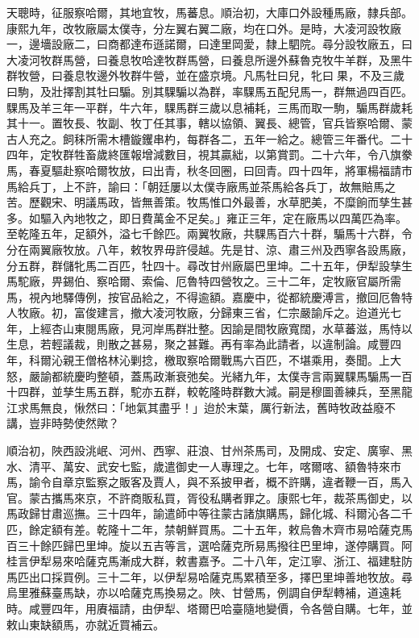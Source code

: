 \begin{pinyinscope}
天聰時，征服察哈爾，其地宜牧，馬蕃息。順治初，大庫口外設種馬廠，隸兵部。康熙九年，改牧廠屬太僕寺，分左翼右翼二廠，均在口外。是時，大凌河設牧廠一，邊墻設廠二，曰商都達布遜諾爾，曰達里岡愛，隸上駟院。尋分設牧廠五，曰大凌河牧群馬營，曰養息牧哈達牧群馬營，曰養息所邊外蘇魯克牧牛羊群，及黑牛群牧營，曰養息牧邊外牧群牛營，並在盛京境。凡馬牡曰兒，牝曰果，不及三歲曰駒，及壯擇割其牡曰騸。別其騍騸以為群，率騍馬五配兒馬一，群無過四百匹。騍馬及羊三年一平群，牛六年，騍馬群三歲以息補耗，三馬而取一駒，騸馬群歲耗其十一。置牧長、牧副、牧丁任其事，轄以協領、翼長、總管，官兵皆察哈爾、蒙古人充之。飼秣所需木槽鏇钁串杓，每群各二，五年一給之。總管三年番代。二十四年，定牧群牲畜歲終匯報增減數目，視其贏絀，以第賞罰。二十六年，令八旗豢馬，春夏驅赴察哈爾牧放，曰出青，秋冬回圈，曰回青。四十四年，將軍楊福請市馬給兵丁，上不許，諭曰：「朝廷屢以太僕寺廠馬並茶馬給各兵丁，故無賠馬之苦。歷觀宋、明議馬政，皆無善策。牧馬惟口外最善，水草肥美，不糜餉而孳生甚多。如驅入內地牧之，即日費萬金不足矣。」雍正三年，定在廠馬以四萬匹為率。至乾隆五年，足額外，溢七千餘匹。兩翼牧廠，共騍馬百六十群，騸馬十六群，令分在兩翼廠牧放。八年，敕牧界毋許侵越。先是甘、涼、肅三州及西寧各設馬廠，分五群，群儲牝馬二百匹，牡四十。尋改甘州廠屬巴里坤。二十五年，伊犁設孳生馬駝廠，畀錫伯、察哈爾、索倫、厄魯特四營牧之。三十二年，定牧廠官屬所需馬，視內地驛傳例，按官品給之，不得逾額。嘉慶中，從都統慶溥言，撤回厄魯特人牧廠。初，富俊建言，撤大凌河牧廠，分歸東三省，仁宗嚴諭斥之。迨道光七年，上經杏山東閱馬廠，見河岸馬群壯整。因諭是間牧廠寬闊，水草蕃滋，馬恃以生息，若輕議裁，則散之甚易，聚之甚難。再有率為此請者，以違制論。咸豐四年，科爾沁親王僧格林沁剿捻，檄取察哈爾戰馬六百匹，不堪乘用，奏聞。上大怒，嚴諭都統慶昀整頓，蓋馬政漸衰弛矣。光緒九年，太僕寺言兩翼騍馬騸馬一百十四群，並孳生馬五群，駝亦五群，較乾隆時群數大減。嗣是穆圖善練兵，至黑龍江求馬無良，愀然曰：「地氣其盡乎！」迨於末葉，厲行新法，舊時牧政益廢不講，豈非時勢使然歟？

順治初，陜西設洮岷、河州、西寧、莊浪、甘州茶馬司，及開成、安定、廣寧、黑水、清平、萬安、武安七監，歲遣御史一人專理之。七年，喀爾喀、額魯特來市馬，諭令自章京監察之販客及賈人，與不系披甲者，概不許購，違者鞭一百，馬入官。蒙古攜馬來京，不許商販私買，胥役私購者罪之。康熙七年，裁茶馬御史，以馬政歸甘肅巡撫。三十四年，諭遣師中等往蒙古諸旗購馬，歸化城、科爾沁各二千匹，餘定額有差。乾隆十二年，禁朝鮮買馬。二十五年，敕烏魯木齊市易哈薩克馬百三十餘匹歸巴里坤。旋以五吉等言，選哈薩克所易馬撥往巴里坤，遂停購買。阿桂言伊犁易來哈薩克馬漸成大群，敕書嘉予。二十八年，定江寧、浙江、福建駐防馬匹出口採買例。三十二年，以伊犁易哈薩克馬累積至多，擇巴里坤善地牧放。尋烏里雅蘇臺馬缺，亦以哈薩克馬換易之。陜、甘營馬，例調自伊犁轉補，道遠耗時。咸豐四年，用賡福請，由伊犁、塔爾巴哈臺隨地變價，令各營自購。七年，並敕山東缺額馬，亦就近買補云。


\end{pinyinscope}
